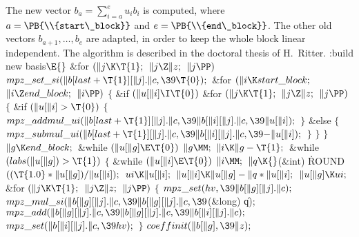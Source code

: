 The new vector
$b_a = \sum_{i=a}^e u_ib_i$ is computed, where
$a= \PB{\\{start\_block}}$ and $e= \PB{\\{end\_block}}$.
The other old vectors $b_{a+1},\ldots,b_e$ are adapted,
in order to keep the whole block linear independent.
The algorithm is described in the doctoral thesis of
H.~Ritter.
\Y\B\4:build new basis\X${}\E{}$\6
\&{for} ${}(\|j\K\T{1};{}$ ${}\|j\Z\|z;{}$ ${}\|j\PP){}$\1\5
${}\\{mpz\_set\_si}(\|b[\\{last}+\T{1}][\|j].\|c,\39\T{0});{}$\2\6
\&{for} ${}(\|i\K\\{start\_block};{}$ ${}\|i\Z\\{end\_block};{}$ ${}\|i\PP){}$\5
${}\{{}$\1\6
\&{if} ${}(\|u[\|i]\I\T{0}){}$\1\6
\&{for} ${}(\|j\K\T{1};{}$ ${}\|j\Z\|z;{}$ ${}\|j\PP){}$\5
${}\{{}$\1\6
\&{if} ${}(\|u[\|i]>\T{0}){}$\5
${}\{{}$\1\6
${}\\{mpz\_addmul\_ui}(\|b[\\{last}+\T{1}][\|j].\|c,\39\|b[\|i][\|j].\|c,\39%
\|u[\|i]);{}$\6
\4${}\}{}$\2\6
\&{else}\5
${}\{{}$\1\6
${}\\{mpz\_submul\_ui}(\|b[\\{last}+\T{1}][\|j].\|c,\39\|b[\|i][\|j].\|c,\39{-}%
\|u[\|i]);{}$\6
\4${}\}{}$\2\6
\4${}\}{}$\2\2\6
\4${}\}{}$\2\6
${}\|g\K\\{end\_block};{}$\6
\&{while} ${}(\|u[\|g]\E\T{0}){}$\1\5
${}\|g\MM;{}$\2\6
${}\|i\K\|g-\T{1};{}$\6
\&{while} ${}(\\{labs}(\|u[\|g])>\T{1}){}$\5
${}\{{}$\1\6
\&{while} ${}(\|u[\|i]\E\T{0}){}$\1\5
${}\|i\MM;{}$\2\6
${}\|q\K{}$(\&{int}) \.{ROUND}${}((\T{1.0}*\|u[\|g])/\|u[\|i]);{}$\6
${}\\{ui}\K\|u[\|i];{}$\6
${}\|u[\|i]\K\|u[\|g]-\|q*\|u[\|i];{}$\6
${}\|u[\|g]\K\\{ui};{}$\6
\&{for} ${}(\|j\K\T{1};{}$ ${}\|j\Z\|z;{}$ ${}\|j\PP){}$\5
${}\{{}$\1\6
${}\\{mpz\_set}(\\{hv},\39\|b[\|g][\|j].\|c);{}$\6
${}\\{mpz\_mul\_si}(\|b[\|g][\|j].\|c,\39\|b[\|g][\|j].\|c,\39{}$(\&{long}) %
\|q);\6
${}\\{mpz\_add}(\|b[\|g][\|j].\|c,\39\|b[\|g][\|j].\|c,\39\|b[\|i][\|j].%
\|c);{}$\6
${}\\{mpz\_set}(\|b[\|i][\|j].\|c,\39\\{hv});{}$\6
\4${}\}{}$\2\6
${}\\{coeffinit}(\|b[\|g],\39\|z);{}$\6
